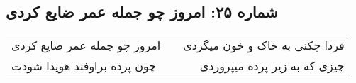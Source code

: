\begin{center}
\section*{شماره ۲۵: امروز چو جمله عمر ضایع کردی}
\label{sec:025}
\begin{longtable}{l p{0.5cm} r}
امروز چو جمله عمر ضایع کردی
&&
فردا چکنی به خاک و خون میگردی
\\
چون پرده براوفتد هویدا شودت
&&
چیزی که به زیر پرده میپروردی
\\
\end{longtable}
\end{center}
